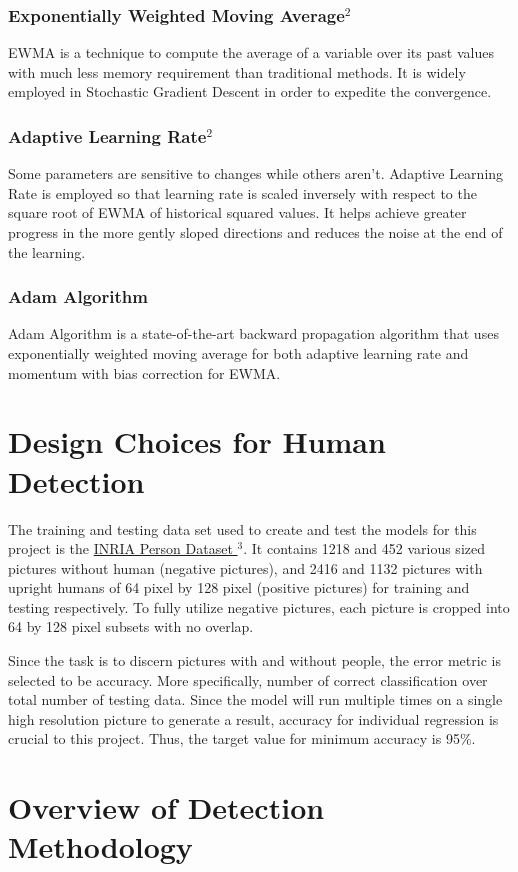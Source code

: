 \documentclass[twocolumn, 12pt]{article}
\begin{document}
\subsubsection*{Exponentially Weighted Moving Average$^2$}
EWMA is a technique to compute the average of a variable over its past values with much less memory requirement than traditional methods. It is widely employed in Stochastic Gradient Descent in order to expedite the convergence.
\subsubsection*{Adaptive Learning Rate$^2$}
Some parameters are sensitive to changes while others aren't. Adaptive Learning Rate is employed so that learning rate is scaled inversely with respect to the square root of EWMA of historical squared values. It helps achieve greater progress in the more gently sloped directions and reduces the noise at the end of the learning.
\subsubsection*{Adam Algorithm}
Adam Algorithm is a state-of-the-art backward propagation algorithm that uses exponentially weighted moving average for both adaptive learning rate and momentum with bias correction for EWMA.
\section{Design Choices for Human Detection}
The training and testing data set used to create and test the models for this project is the \href{http://pascal.inrialpes.fr/data/human/}{INRIA Person Dataset $^3$}. It contains 1218 and 452 various sized pictures without human (negative pictures), and 2416 and 1132 pictures with upright humans of 64 pixel by 128 pixel (positive pictures) for training and testing respectively. To fully utilize negative pictures, each picture is cropped into 64 by 128 pixel subsets with no overlap.

Since the task is to discern pictures with and without people, the error metric is selected to be accuracy. More specifically, number of correct classification over total number of testing data. Since the model will run multiple times on a single high resolution picture to generate a result, accuracy for individual regression is crucial to this project. Thus, the target value for minimum accuracy is 95\%. 

\section{Overview of Detection Methodology}
\end{document}
